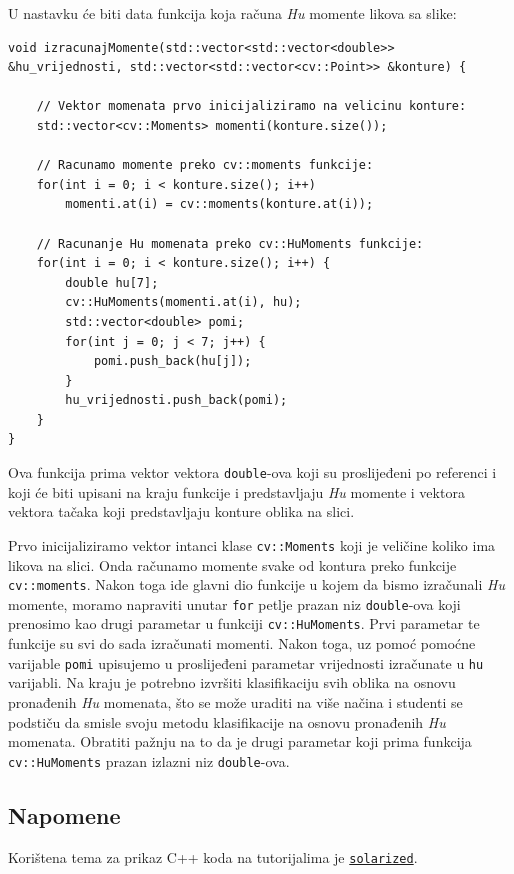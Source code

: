 \documentclass[a4paper, 12pt]{article}
\begin{document}
U nastavku će biti data funkcija koja računa \textit{Hu} momente likova sa slike:

\begin{lstlisting}
void izracunajMomente(std::vector<std::vector<double>> &hu_vrijednosti, std::vector<std::vector<cv::Point>> &konture) {

    // Vektor momenata prvo inicijaliziramo na velicinu konture:
    std::vector<cv::Moments> momenti(konture.size());

    // Racunamo momente preko cv::moments funkcije:
    for(int i = 0; i < konture.size(); i++)
        momenti.at(i) = cv::moments(konture.at(i));

    // Racunanje Hu momenata preko cv::HuMoments funkcije:
    for(int i = 0; i < konture.size(); i++) {
        double hu[7];
        cv::HuMoments(momenti.at(i), hu);
        std::vector<double> pomi;
        for(int j = 0; j < 7; j++) {
            pomi.push_back(hu[j]);
        }
        hu_vrijednosti.push_back(pomi);
    }
}
\end{lstlisting}

Ova funkcija prima vektor vektora \lstinline{double}-ova koji su proslijeđeni po referenci i koji će biti upisani na kraju funkcije i predstavljaju \textit{Hu} momente i vektora vektora tačaka koji predstavljaju konture oblika na slici. 

Prvo inicijaliziramo vektor intanci klase \lstinline{cv::Moments} koji je veličine koliko ima likova na slici. Onda računamo momente svake od kontura preko funkcije \lstinline{cv::moments}. Nakon toga ide glavni dio funkcije u kojem da bismo izračunali \textit{Hu} momente, moramo napraviti unutar \lstinline{for} petlje prazan niz \lstinline{double}-ova koji prenosimo kao drugi parametar u funkciji \lstinline{cv::HuMoments}. Prvi parametar te funkcije su svi do sada izračunati momenti. Nakon toga, uz pomoć pomoćne varijable \lstinline{pomi} upisujemo u proslijeđeni parametar vrijednosti izračunate u \lstinline{hu} varijabli. Na kraju je potrebno izvršiti klasifikaciju svih oblika na osnovu pronađenih \textit{Hu} momenata, što se može uraditi na više načina i studenti se podstiču da smisle svoju metodu klasifikacije na osnovu pronađenih \textit{Hu} momenata. Obratiti pažnju na to da je drugi parametar koji prima funkcija \lstinline{cv::HuMoments} prazan izlazni niz \lstinline{double}-ova.

\subsection*{Napomene}

Korištena tema za prikaz C++ koda na tutorijalima je \href{https://ethanschoonover.com/solarized/}{\lstinline{solarized}}\cite{solarized}.

\printbibliography
\end{document}

